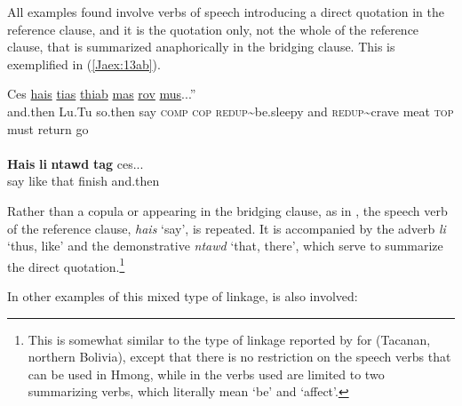 \documentclass[output=paper]{LSP/langsci}
\begin{document}
All examples found involve verbs of speech introducing a direct quotation in the reference clause, and it is the quotation only, not the whole of the reference clause, that is summarized anaphorically in the bridging clause. This is exemplified in (\ref{Jaex:13ab}).

\begin{exe}
\ex \label{Jaex:13ab}
\begin{xlist}
\ex \label{Jaex:13a}
\gll Ces \underline{} \underline{} \underline{hais} \underline{tias} \underline{}     \underline{} \underline{thiab} \underline{} \underline{} \underline{mas} \underline{} \underline{rov} \underline{mus}...'' \\
 and.then Lu.Tu so.then say \textsc{comp} \textsc{cop} \textsc{redup}{\textasciitilde}be.sleepy and \textsc{redup}{\textasciitilde}crave  meat \textsc{top} must return go\\
\glt {}\\
\ex \label{Jaex:13b}
\gll \textbf{Hais} \textbf{li}  \textbf{ntawd} \textbf{tag} ces...\\     	      
     say like that  finish  and.then\\
\glt {} \citep[][8]{johnson92}
\end{xlist}
\end{exe}


\noindent
Rather than a copula or  appearing in the bridging clause, as in , the speech verb of the reference clause, \textit{hais} `say', is repeated. It is accompanied by the  adverb \textit{li} `thus, like' and the demonstrative \textit{ntawd} `that, there', which serve to summarize the direct quotation.\footnote{ This is somewhat similar to the type of linkage reported by \citet[][128--129]{Guillaume2011} for  (Tacanan, northern Bolivia), except that there is no restriction on the speech verbs that can be used in Hmong, while in  the verbs used are limited to two summarizing verbs, which literally mean `be' and `affect'.} 

In other examples of this mixed type of linkage,  is also involved:
\end{document}
